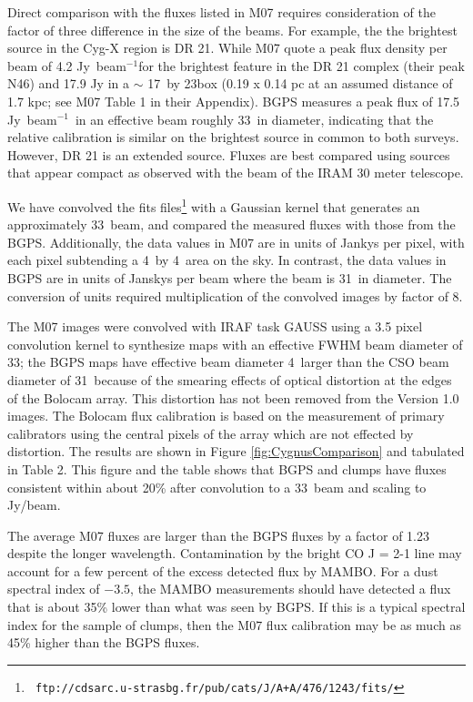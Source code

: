 \documentclass{emulateapj}
\newcommand\jyb{Jy~beam$^{-1}$}
\newcommand{\bcamfwhm}{33\arcsec}
\begin{document}
Direct comparison with the fluxes listed in M07 requires consideration
of the factor of three difference in the size of the beams.  For
example, the the brightest source in the Cyg-X region is DR 21.  While
M07 quote a peak flux density per beam of 4.2 \jyb for the
brightest feature in the DR 21 complex (their peak N46) and 17.9 Jy in
a $\sim$ 17\arcsec\ by 23\arcsec box (0.19 x 0.14 pc at an assumed
distance of 1.7 kpc; see M07 Table 1 in their Appendix).
BGPS measures a peak flux of 17.5 \jyb\ in an effective beam roughly
\bcamfwhm\ in diameter, indicating that the relative calibration is
similar on the brightest source in common to both surveys.  However,
DR 21 is an extended source.  Fluxes are best compared using sources
that appear compact as observed with the beam of the IRAM 30 meter
telescope.

We have convolved the \citet{motte07} fits files\footnote{{\tt
ftp://cdsarc.u-strasbg.fr/pub/cats/J/A+A/476/1243/fits/}} with a Gaussian
kernel that generates an approximately \bcamfwhm\ beam, and compared the
measured fluxes with those from the BGPS.  Additionally, the data values
in M07 are in units of Jankys per pixel, with each pixel subtending
a 4\arcsec\ by 4\arcsec\ area on the sky.  In contrast, the data values
in BGPS are in units of Janskys per beam where the beam is 31\arcsec\
in diameter.   The conversion of units required multiplication of the
convolved images by factor of 8.

The M07 images were convolved with IRAF task
GAUSS using a 3.5 pixel convolution kernel to synthesize maps with an
effective FWHM beam diameter of \bcamfwhm ;  the BGPS maps have effective
beam diameter 4\arcsec\ larger than the CSO beam diameter of 31\arcsec\
because of the smearing effects of optical distortion at the edges of the
Bolocam array.  This distortion has not been removed from the Version 1.0
images.  The Bolocam flux calibration is based on the measurement of
primary calibrators using the central pixels of the array which are not
effected by distortion.   The results are shown  in Figure
\ref{fig:CygnusComparison} and tabulated in Table 2.  This figure and
the table shows that BGPS and \citet{motte07} clumps have fluxes
consistent within about 20\% after convolution to a \bcamfwhm\ beam and
scaling to Jy/beam.

The average M07 fluxes are larger than the BGPS fluxes by a factor
of 1.23 despite the longer wavelength.  Contamination by the bright
CO J = 2-1 line may account for a few percent of the excess
detected flux by MAMBO.    For a dust spectral index of $-3.5$, the
MAMBO measurements should have detected a flux that is about 35\% lower
than what was seen by BGPS.    If this is a typical spectral index for
the sample of clumps, then the M07 flux calibration may be as
much as 45\% higher than the BGPS fluxes.
\end{document}
